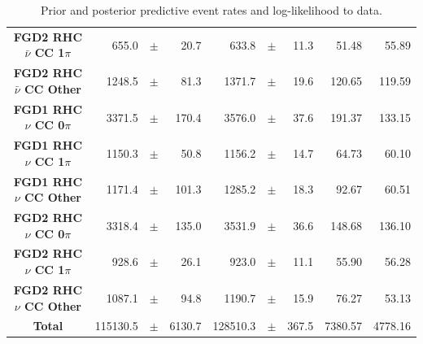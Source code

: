 \begin{center}
\begin{table}
\begin{adjustbox}{max width=1.1\textwidth,center}
\begin{tabular}{S||
                r
                p{0.26cm}
                r
                |r
                p{0.26cm}
                r
                |r
                r}
\textbf{FGD2 RHC $\bar{\nu}$ CC 1$\pi$} & 655.0 & $\pm$ & 20.7 & 633.8 & $\pm$ & 11.3 & 51.48 & 55.89 \\
\textbf{FGD2 RHC $\bar{\nu}$ CC Other} & 1248.5 & $\pm$ & 81.3 & 1371.7 & $\pm$ & 19.6 & 120.65 & 119.59\\ \hline
\textbf{FGD1 RHC $\nu$ CC 0$\pi$} & 3371.5 & $\pm$ & 170.4 & 3576.0 & $\pm$ & 37.6 & 191.37 & 133.15\\
\textbf{FGD1 RHC $\nu$ CC 1$\pi$} & 1150.3 & $\pm$ & 50.8 & 1156.2 & $\pm$ & 14.7 & 64.73 & 60.10\\
\textbf{FGD1 RHC $\nu$ CC Other} & 1171.4 & $\pm$ & 101.3 & 1285.2 & $\pm$ & 18.3 & 92.67 & 60.51\\ \hline
\textbf{FGD2 RHC $\nu$ CC 0$\pi$} & 3318.4 & $\pm$ & 135.0 & 3531.9 & $\pm$ & 36.6 & 148.68 & 136.10\\
\textbf{FGD2 RHC $\nu$ CC 1$\pi$} & 928.6 & $\pm$ & 26.1 & 923.0 & $\pm$ & 11.1 & 55.90 & 56.28\\
\textbf{FGD2 RHC $\nu$ CC Other} & 1087.1 & $\pm$ & 94.8 & 1190.7 & $\pm$ & 15.9 & 76.27 & 53.13 \\ \hline
\textbf{Total} & 115130.5 & $\pm$ & 6130.7 & 128510.3 & $\pm$ & 367.5 & 7380.57 & 4778.16 \\ \hline\hline
\end{tabular}
\end{adjustbox}
\caption{Prior and posterior predictive event rates and log-likelihood to data.}
\label{tab:predrates}
\end{table}
\end{center}

